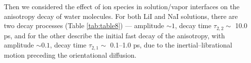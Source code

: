 {%
%
%
%
%

Then we considered the effect of ion species in solution/vapor interfaces on the anisotropy decay of water molecules.
For both LiI and NaI solutions, there are two decay processes 
(Table \ref{tab:table8})
--- amplitude $\sim 1$,
decay time $\tau_{2,2}\sim$ 10.0 ps, and for the other describe the initial fast decay 
of the anisotropy, with amplitude $\sim 0.1$, decay time $\tau_{2,1}\sim$ 0.1--1.0 ps, 
due to the inertial--librational motion preceding the orientational diffusion.
%


}
